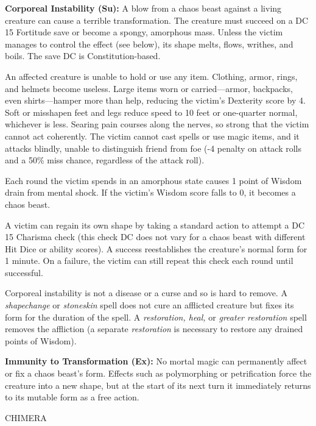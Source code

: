\documentclass{article}
\begin{document}
\textbf{Corporeal Instability (Su):} A blow from a chaos beast against a living 
creature can cause a terrible transformation. The creature must succeed on a DC 
15 Fortitude save or become a spongy, amorphous mass. Unless the victim manages 
to control the effect (see below), its shape melts, flows, writhes, and boils. 
The save DC is Constitution-based.

An affected creature is unable to hold or use any item. Clothing, armor, rings, 
and helmets become useless. Large items worn or carried---armor, backpacks, even 
shirts---hamper more than help, reducing the victim's Dexterity score by 4. Soft 
or misshapen feet and legs reduce speed to 10 feet or one-quarter normal, whichever 
is less. Searing pain courses along the nerves, so strong that the victim cannot 
act coherently. The victim cannot cast spells or use magic items, and it attacks 
blindly, unable to distinguish friend from foe (-4 penalty on attack rolls and 
a 50\% miss chance, regardless of the attack roll).

Each round the victim spends in an amorphous state causes 1 point of Wisdom drain 
from mental shock. If the victim's Wisdom score falls to 0, it becomes a chaos 
beast.

A victim can regain its own shape by taking a standard action to attempt a DC 15 
Charisma check (this check DC does not vary for a chaos beast with different Hit 
Dice or ability scores). A success reestablishes the creature's normal form for 
1 minute. On a failure, the victim can still repeat this check each round until 
successful.

Corporeal instability is not a disease or a curse and so is hard to remove. A \textit{shapechange 
}or \textit{stoneskin }spell does not cure an afflicted creature but fixes its 
form for the duration of the spell. A \textit{restoration, heal, }or \textit{greater 
restoration }spell removes the affliction (a separate \textit{restoration }is necessary 
to restore any drained points of Wisdom).

\textbf{Immunity to Transformation (Ex): }No mortal magic can permanently affect 
or fix a chaos beast's form. Effects such as polymorphing or petrification force 
the creature into a new shape, but at the start of its next turn it immediately 
returns to its mutable form as a free action.

\vspace{12pt}
{\LARGE{}CHIMERA}
\end{document}
